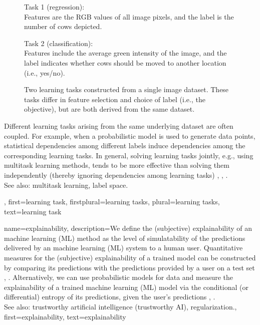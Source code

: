 {{{\begin{figure}[H]
			\begin{minipage}[t]{0.45\textwidth}
    			Task 1 (regression): \\
        			Features are the RGB values of all image pixels,
        			and the label is the number of cows depicted.
			\end{minipage}
			\hfill
			\begin{minipage}[t]{0.45\textwidth}
    			Task 2 (classification): \\
			Features include the average green intensity of the image, 
        			and the label indicates whether cows should be moved to another location (i.e., yes/no).
			\end{minipage}
			\caption{Two learning tasks constructed from a single image dataset. 
			These tasks differ in feature selection and choice of label (i.e., the objective), 
			but are both derived from the same dataset.}
			\label{fig:learning_tasks_cows_dict}
		\end{figure}
		Different learning tasks arising from the same underlying dataset are often coupled. 
		For example, when a probabilistic model is used to generate data points, statistical 
		dependencies among different labels induce dependencies among the corresponding 
		learning tasks. In general, solving learning tasks jointly, e.g., using multitask learning 
		methods, tends to be more effective than solving them independently (thereby ignoring 
		dependencies among learning tasks) \cite{Caruana:1997wk}, \cite{JungGaphLassoSPL}, \cite{CSGraphSelJournal}.
	 			\\ 
		See also: multitask learning, label space.},
	first={learning task},
	firstplural={learning tasks},
	plural={learning tasks}, 
	text={learning task}
}

{name={explainability},
	description={We define the (subjective) explainability of an machine learning (ML) method 
		as the level of simulatability \cite{Colin:2022aa} of the predictions 
		delivered by an machine learning (ML) system to a human user. Quantitative measures for the 
		(subjective) explainability of a trained model can be constructed by 
		comparing its predictions with the predictions provided by a user 
		on a test set \cite{Colin:2022aa}, \cite{Zhang:2024aa}. Alternatively, we can use 
		probabilistic models for data and measure the explainability of a trained machine learning (ML) 
		model via the conditional (or differential) entropy of its predictions, given the 
		user's predictions \cite{JunXML2020}, \cite{Chen2018}.
						\\ 
		See also: trustworthy artificial intelligence (trustworthy AI), regularization.},
	first={explainability},
	text={explainability}
}

}
